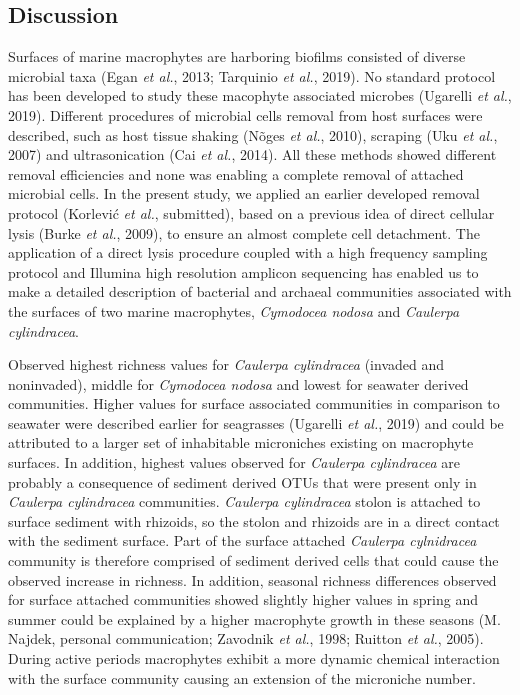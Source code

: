 \documentclass[12pt,]{article}
\begin{document}
\hypertarget{discussion}{%
\subsection{Discussion}\label{discussion}}

Surfaces of marine macrophytes are harboring biofilms consisted of
diverse microbial taxa (Egan \emph{et al.}, 2013; Tarquinio \emph{et
al.}, 2019). No standard protocol has been developed to study these
macophyte associated microbes (Ugarelli \emph{et al.}, 2019). Different
procedures of microbial cells removal from host surfaces were described,
such as host tissue shaking (Nõges \emph{et al.}, 2010), scraping (Uku
\emph{et al.}, 2007) and ultrasonication (Cai \emph{et al.}, 2014). All
these methods showed different removal efficiencies and none was
enabling a complete removal of attached microbial cells. In the present
study, we applied an earlier developed removal protocol (Korlević
\emph{et al.}, submitted), based on a previous idea of direct cellular
lysis (Burke \emph{et al.}, 2009), to ensure an almost complete cell
detachment. The application of a direct lysis procedure coupled with a
high frequency sampling protocol and Illumina high resolution amplicon
sequencing has enabled us to make a detailed description of bacterial
and archaeal communities associated with the surfaces of two marine
macrophytes, \emph{Cymodocea nodosa} and \emph{Caulerpa cylindracea}.

Observed highest richness values for \emph{Caulerpa cylindracea}
(invaded and noninvaded), middle for \emph{Cymodocea nodosa} and lowest
for seawater derived communities. Higher values for surface associated
communities in comparison to seawater were described earlier for
seagrasses (Ugarelli \emph{et al.}, 2019) and could be attributed to a
larger set of inhabitable microniches existing on macrophyte surfaces.
In addition, highest values observed for \emph{Caulerpa cylindracea} are
probably a consequence of sediment derived OTUs that were present only
in \emph{Caulerpa cylindracea} communities. \emph{Caulerpa cylindracea}
stolon is attached to surface sediment with rhizoids, so the stolon and
rhizoids are in a direct contact with the sediment surface. Part of the
surface attached \emph{Caulerpa cylnidracea} community is therefore
comprised of sediment derived cells that could cause the observed
increase in richness. In addition, seasonal richness differences
observed for surface attached communities showed slightly higher values
in spring and summer could be explained by a higher macrophyte growth in
these seasons (M. Najdek, personal communication; Zavodnik \emph{et
al.}, 1998; Ruitton \emph{et al.}, 2005). During active periods
macrophytes exhibit a more dynamic chemical interaction with the surface
community causing an extension of the microniche number.
\end{document}
